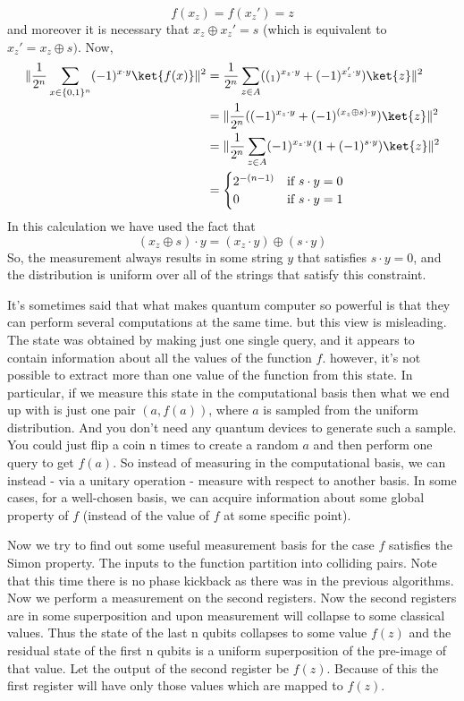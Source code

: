 \documentclass[12pt, oneside]{book}
\theoremstyle{definition}
\theoremstyle{definition}
\theoremstyle{remark}
\begin{document}
\[
f(x_z)=f(x_z')=z
\]
and moreover it is necessary that $x_z\oplus x_z'=s$ (which is equivalent to $x_z'=x_z\oplus s)$. Now,
\begin{align*}
\|\frac{1}{2^n}\sum_{x\in\{0,1\}^n} (-1)^{x\cdot y} \ket{f(x)} \|^2&=\frac{1}{2^n}\sum_{z\in A} ((_1)^{x_z\cdot y} + (-1)^{x_z'\cdot y})\ket{z}\|^2\\
&=\|\frac{1}{2^n} ((-1)^{x_z \cdot y} + (-1)^{(x_z \oplus s)\cdot y})\ket{z}\|^2\\
&=\|\frac{1}{2^n} \sum_{z\in A} (-1)^{x_z\cdot y} (1+(-1)^{s\cdot y})\ket{z}\|^2\\
&=\begin{cases} 2^{-(n-1)} & \text{if } s\cdot y=0 \\ 0 & \text{if } s\cdot y=1 \end{cases} 
\end{align*}
In this calculation we have used the fact that 
\[
(x_z\oplus s)\cdot y=(x_z\cdot y)\oplus (s\cdot y)
\]
So, the measurement always results in some string $y$ that satisfies $s\cdot y=0$, and the distribution is uniform over all of the strings that satisfy this constraint.

It's sometimes said that what makes quantum computer so powerful is that they can perform several computations at the same time. but this view is misleading. The state was obtained by making just one single query, and it appears to contain information about all the values of the function $f$. however, it's not possible to extract more than one value of the function from this state. In particular, if we measure this state in the computational basis then what we end up with is just one pair $(a,f(a))$, where $a$ is sampled from the uniform distribution. And you don't need any quantum devices to generate such a sample. You could just flip a coin n times to create a random $a$ and then perform one query to get $f(a)$. So instead of measuring in the computational basis, we can instead - via a unitary operation - measure with respect to another basis. In some cases, for a well-chosen basis, we can acquire information about some global property of $f$ (instead of the value of $f$ at some specific point).


Now we try to find out some useful measurement basis for the case $f$ satisfies the Simon property. The inputs to the function partition into colliding pairs.
Note that this time there is no phase kickback as there was in the previous algorithms. 
Now  we perform a measurement on the second registers. Now the second registers are in some superposition and upon measurement will 
collapse to some classical values. Thus the state of the last n qubits collapses to some value $f(z)$ and the residual state of the first n qubits is a uniform superposition of the pre-image of that value. Let the output of the second register be $f(z)$. Because of this the first register will have only those values which are mapped to $f(z)$.
\end{document}
